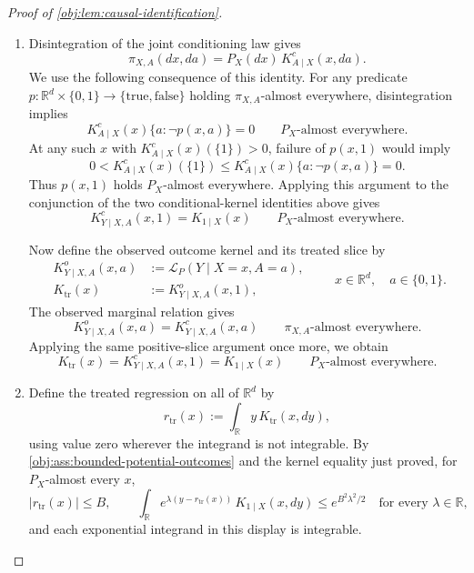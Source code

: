 \begin{proof}[Proof of \cref{obj:lem:causal-identification}]
\begin{enumerate}
\item Disintegration of the joint conditioning law gives
\[
\pi_{X,A}(dx,da)=P_X(dx)\,K^c_{A\mid X}(x,da).
\]
We use the following consequence of this identity. For any predicate
\(p:\mathbb R^d\times\{0,1\}\to\{\text{true},\text{false}\}\) holding
\(\pi_{X,A}\)-almost everywhere, disintegration implies
\[
K^c_{A\mid X}(x)\{a:\neg p(x,a)\}=0
\qquad P_X\text{-almost everywhere}.
\]
At any such \(x\) with \(K^c_{A\mid X}(x)(\{1\})>0\), failure of \(p(x,1)\) would imply
\[
0<K^c_{A\mid X}(x)(\{1\})
\le K^c_{A\mid X}(x)\{a:\neg p(x,a)\}=0.
\]
Thus \(p(x,1)\) holds \(P_X\)-almost everywhere. Applying this argument to the conjunction of the two conditional-kernel identities above gives
\[
K^c_{Y\mid X,A}(x,1)=K_{1\mid X}(x)
\qquad P_X\text{-almost everywhere}.
\]

Now define the observed outcome kernel and its treated slice by
\[
\begin{aligned}
K^o_{Y\mid X,A}(x,a)&:=\mathcal L_P(Y\mid X=x,A=a),\\
K_{\mathrm{tr}}(x)&:=K^o_{Y\mid X,A}(x,1),
\end{aligned}
\qquad x\in\mathbb R^d,\quad a\in\{0,1\}.
\]
The observed marginal relation gives
\[
K^o_{Y\mid X,A}(x,a)=K^c_{Y\mid X,A}(x,a)
\qquad \pi_{X,A}\text{-almost everywhere}.
\]
Applying the same positive-slice argument once more, we obtain
\[
K_{\mathrm{tr}}(x)
=K^c_{Y\mid X,A}(x,1)
=K_{1\mid X}(x)
\qquad P_X\text{-almost everywhere}.
\]

\item Define the treated regression on all of \(\mathbb R^d\) by
\[
r_{\mathrm{tr}}(x):=\int_{\mathbb R}y\,K_{\mathrm{tr}}(x,dy),
\]
using value zero wherever the integrand is not integrable. By
\cref{obj:ass:bounded-potential-outcomes} and the kernel equality just proved, for \(P_X\)-almost every \(x\),
\[
|r_{\mathrm{tr}}(x)|\le B,
\qquad
\int_{\mathbb R}
e^{\lambda(y-r_{\mathrm{tr}}(x))}\,K_{1\mid X}(x,dy)
\le e^{B^2\lambda^2/2}
\quad\text{for every }\lambda\in\mathbb R,
\]
and each exponential integrand in this display is integrable.


\end{enumerate}
\end{proof}
